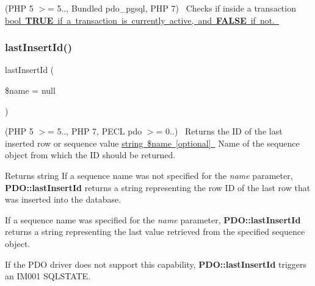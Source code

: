 (P\+HP 5 $>$= 5.., Bundled pdo\+\_\+pgsql, P\+HP 7)~\newline
 Checks if inside a transaction \mbox{\hyperlink{}{bool {\bfseries T\+R\+UE} if a transaction is currently active, and {\bfseries F\+A\+L\+SE} if not. }}\mbox{\label{interface_pes_1_1_database_1_1_handler_1_1_mini_1_1_p_d_o_interface_a9f9cb8ca720d7bbcb03869def521336e}} 
\subsubsection{\texorpdfstring{last\+Insert\+Id()}{lastInsertId()}}
{\footnotesize\ttfamily last\+Insert\+Id (\begin{DoxyParamCaption}\item[{}]{\$name = {\ttfamily null} }\end{DoxyParamCaption})}

(P\+HP 5 $>$= 5.., P\+HP 7, P\+E\+CL pdo $>$= 0..)~\newline
 Returns the ID of the last inserted row or sequence value \mbox{\hyperlink{}{string \$name \mbox{[}optional\mbox{]} }} Name of the sequence object from which the ID should be returned. 

\begin{DoxyReturn}{Returns}
string If a sequence name was not specified for the {\itshape name} parameter, {\bfseries P\+D\+O\+::last\+Insert\+Id} returns a string representing the row ID of the last row that was inserted into the database. 
\end{DoxyReturn}


If a sequence name was specified for the {\itshape name} parameter, {\bfseries P\+D\+O\+::last\+Insert\+Id} returns a string representing the last value retrieved from the specified sequence object. 

If the P\+DO driver does not support this capability, {\bfseries P\+D\+O\+::last\+Insert\+Id} triggers an I\+M001 S\+Q\+L\+S\+T\+A\+TE. \mbox{\label{interface_pes_1_1_database_1_1_handler_1_1_mini_1_1_p_d_o_interface_af212c3950522906fe864096a27c24156}} 
